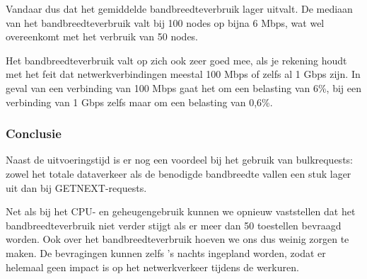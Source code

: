 Vandaar dus dat het gemiddelde bandbreedteverbruik lager uitvalt.
De mediaan van het bandbreedteverbruik valt bij 100 nodes op bijna 6 Mbps, wat wel overeenkomt met het verbruik van 50 nodes.

Het bandbreedteverbruik valt op zich ook zeer goed mee, als je rekening houdt met het feit dat netwerkverbindingen meestal 100 Mbps of zelfs al 1 Gbps zijn.
In geval van een verbinding van 100 Mbps gaat het om een belasting van 6\%, bij een verbinding van 1 Gbps zelfs maar om een belasting van 0,6\%.

\subsubsection{Conclusie}

Naast de uitvoeringstijd is er nog een voordeel bij het gebruik van bulkrequests:
zowel het totale dataverkeer als de benodigde bandbreedte vallen een stuk lager uit dan bij GETNEXT-requests.

Net als bij het CPU- en geheugengebruik kunnen we opnieuw vaststellen dat het bandbreedteverbruik niet verder stijgt als er meer dan 50 toestellen bevraagd worden.
Ook over het bandbreedteverbruik hoeven we ons dus weinig zorgen te maken.
De bevragingen kunnen zelfs 's nachts ingepland worden, zodat er helemaal geen impact is op het netwerkverkeer tijdens de werkuren.
